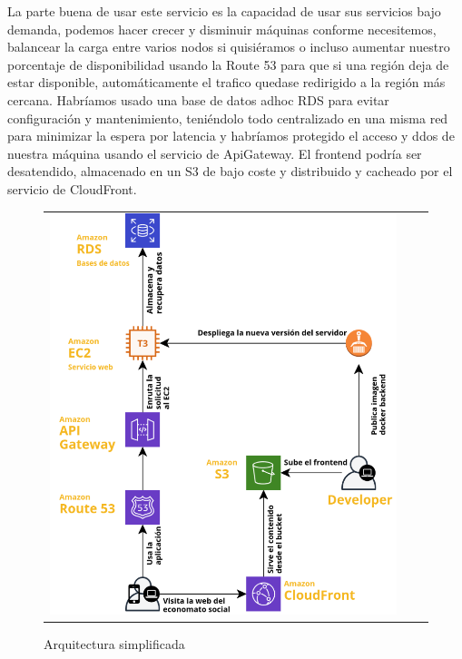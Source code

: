\vspace{1em}
\par La parte buena de usar este servicio es la capacidad de usar sus servicios bajo demanda, podemos hacer crecer y disminuir máquinas conforme necesitemos, balancear la carga entre varios nodos si quisiéramos o incluso aumentar nuestro porcentaje de disponibilidad usando la Route 53 para que si una región deja de estar disponible, automáticamente el trafico quedase redirigido a la región más cercana. Habríamos usado una base de datos adhoc RDS para evitar configuración y mantenimiento, teniéndolo todo centralizado en una misma red para minimizar la espera por latencia y habríamos protegido el acceso y ddos de nuestra máquina usando el servicio de ApiGateway. El frontend podría ser desatendido, almacenado en un S3 de bajo coste y distribuido y cacheado por el servicio de CloudFront.
\begin{figure}[h]
\centering
\begin{tabular}{ccc}
\includegraphics[scale=0.5]{archivos/arquitecturaAws.png}
\end{tabular}
\caption{Arquitectura simplificada}
\end{figure}
